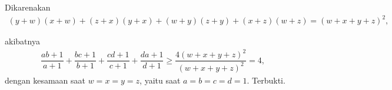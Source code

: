 Dikarenakan
\begin{align*}
    (y+w)(x+w)+(z+x)(y+x)+(w+y)(z+y)+(x+z)(w+z) = (w+x+y+z)^2,
\end{align*}

akibatnya
\begin{align*}
    \dfrac{ab+1}{a+1} + \dfrac{bc+1}{b+1} + \dfrac{cd+1}{c+1} + \dfrac{da+1}{d+1} \geq \dfrac{4(w+x+y+z)^2}{(w+x+y+z)^2} = 4,
\end{align*}
dengan kesamaan saat $w=x=y=z$, yaitu saat $a=b=c=d=1$. Terbukti.

